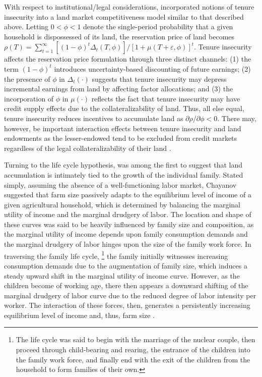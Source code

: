 \documentclass[english]{article}
\begin{document}
With respect to institutional/legal considerations, \citet{carter1998b} 
incorporated notions of tenure insecurity into a land market competitiveness 
model similar to that described above.
Letting $0 < \phi < 1$ denote the single-period probability that a given 
household is dispossessed of its land, the reservation price of land becomes 
$\rho(T) = \sum_{t=1}^{\infty} [(1 - \phi)^t \Delta_t(T, \phi)]/
[1 + \mu(T + \varepsilon, \phi)]^t$.
Tenure insecurity affects the reservation price formulation through three distinct
channels: (1) the term $(1 - \phi)^t$ introduces uncertainty-based discounting 
of future earnings; (2) the presence of $\phi$ in $\Delta_t(\cdot)$ suggests 
that tenure insecurity may depress incremental earnings from land by affecting 
factor allocations; and (3) the incorporation of $\phi$ in $\mu(\cdot)$ reflects 
the fact that tenure insecurity may have credit supply effects due to the 
collateralizability of land.
Thus, all else equal, tenure insecurity reduces incentives to accumulate land 
as $\partial \rho / \partial \phi < 0$.
There may, however, be important interaction effects between tenure insecurity
and land endowments as the lesser-endowed tend to be excluded from credit 
markets regardless of the legal collateralizability of their land \citep{carter1988}.

Turning to the life cycle hypothesis, \citet{chayanov1966} was among the first 
to suggest that land accumulation is intimately tied to the growth of the 
individual family. 
Stated simply, assuming the absence of a well-functioning labor market, 
Chayanov suggested that farm size passively adapts to the equilibrium level of 
income of a given agricultural household, which is determined by balancing 
the marginal utility of income and the marginal drudgery of labor. 
The location and shape of these curves was said to be heavily influenced by 
family size and composition, as the marginal utility of income depends upon 
family consumption demands and the marginal drudgery of labor hinges upon 
the size of the family work force. 
In traversing the family life cycle,%
\footnote{The life cycle was said to begin with the marriage of the nuclear 
couple, then proceed through child-bearing and rearing, the entrance of the 
children into the family work force, and finally end with the exit of the children 
from the household to form families of their own.} 
the family initially witnesses increasing consumption demands due to the 
augmentation of family size, which induces a steady upward shift in the 
marginal utility of income curve. 
However, as the children become of working age, there then appears a 
downward shifting of the marginal drudgery of labor curve due to the reduced 
degree of labor intensity per worker. 
The interaction of these forces, then, generates a persistently increasing 
equilibrium level of income and, thus, farm size 
\citep{harrison1975, banaji1976}. 
\end{document}

